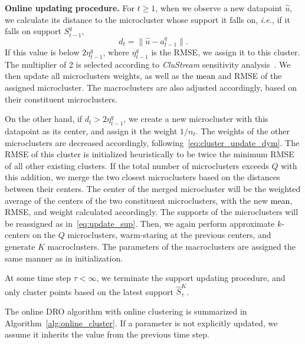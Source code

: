 \documentclass[12pt]{article}
\renewcommand{\paragraph}[1]{\textbf{#1.}\;}
\newcommand{\bnote}[1]{\textcolor{purple}{\textbf{[B: #1]}}}
\newcommand{\ie}{{\it i.e.}}
\newcommand{\RC}[1]{\textcolor{black}{#1}}
\newcommand{\RC}[1]{\textcolor{blue}{#1}}
\begin{document}

\paragraph{Online updating procedure}
For $t \geq 1$, when we observe a new datapoint $\hat{u}$, we calculate its distance to the microcluster whose support it falls on, \ie, if it falls on support $S^q_{t-1},$
$$d_t = \|\hat{u} - a^q_{t-1}\|.$$
If this value is below $2\eta^q_{t-1}$, where $\eta^q_{t-1}$ is the RMSE, we assign it to this cluster. The multiplier of 2 is selected according to {\it CluStream} sensitivity analysis~\cite[Section 6.4]{clustream}. We then update all microclusters weights, as well as the \RC{mean} and RMSE of the assigned microcluster. The macroclusters are also adjusted accordingly, based on their constituent microclusters. 

On the other hand, if $d_t > 2\eta^q_{t-1}$, we create a new microcluster with this datapoint as its center, and assign it the weight $1/n_t$. The weights of the other microclusters are decreased accordingly, following~\eqref{eq:cluster_update_dym}. The RMSE of this cluster is initialized heuristically to be twice the minimum RMSE of all other existing clusters. If the total number of microclusters exceeds $Q$ with this addition, we merge the two closest microclusters based on the distances between their centers. The center of the merged microcluster will be the weighted average of the centers of the two constituent microclusters, with the new \RC{mean}, RMSE, and weight calculated accordingly. The supports of the microclusters will be reassigned as in~\eqref{eq:update_sup}. 
Then, we again perform approximate $k$-centers on the $Q$ microclusters, warm-staring at the previous centers, and generate $K$ macroclusters. The parameters of the macroclusters are assigned the same manner as in initialization. 

At some time step $\tau < \infty$, we terminate the support updating procedure, and only cluster points based on the latest support $\hat{S}^K_\tau$. 

The online \gls{DRO} algorithm with online clustering is summarized in Algorithm~\ref{alg:online_cluster}. If a parameter is not explicitly updated, we assume it inherits the value from the previous time step. 
\end{document}
